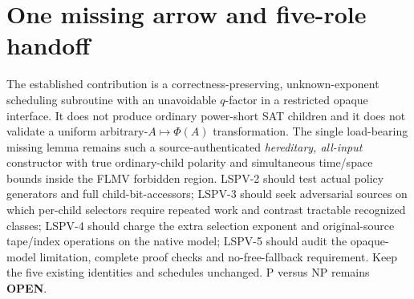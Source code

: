 \documentclass[11pt]{article}
\begin{document}
\section{One missing arrow and five-role handoff}
The established contribution is a correctness-preserving, unknown-exponent scheduling subroutine with an unavoidable $q$-factor in a restricted opaque interface. It does not produce ordinary power-short SAT children and it does not validate a uniform arbitrary-$A\mapsto\Phi(A)$ transformation. The single load-bearing missing lemma remains such a source-authenticated \emph{hereditary, all-input} constructor with true ordinary-child polarity and simultaneous time/space bounds inside the FLMV forbidden region. LSPV-2 should test actual policy generators and full child-bit-accessors; LSPV-3 should seek adversarial sources on which per-child selectors require repeated work and contrast tractable recognized classes; LSPV-4 should charge the extra selection exponent and original-source tape/index operations on the native model; LSPV-5 should audit the opaque-model limitation, complete proof checks and no-free-fallback requirement. Keep the five existing identities and schedules unchanged. P versus NP remains \textbf{OPEN}.


\end{document}
